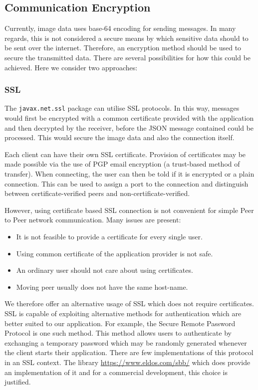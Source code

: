 \documentclass[10pt, a4paper]{article}
\begin{document}
\subsection{Communication Encryption}

Currently, image data uses base-64 encoding for sending messages.
In many regards, this is not considered a secure means by which sensitive data should to be sent over the internet.
Therefore, an encryption method should be used to secure the transmitted data.
There are several possibilities for how this could be achieved.
Here we consider two approaches:

\subsubsection{SSL}

The \verb|javax.net.ssl| package can utilise SSL protocols.
In this way, messages would first be encrypted with a common certificate provided with the application and then decrypted by the receiver, before the JSON message contained could be processed.
This would secure the image data and also the connection itself.

Each client can have their own SSL certificate.
Provision of certificates may be made possible via the use of PGP email encryption (a trust-based method of transfer).
When connecting, the user can then be told if it is encrypted or a plain connection.
This can be used to assign a port to the connection and distinguish between certificate-verified peers and non-certificate-verified.

However, using certificate based SSL connection is not convenient for simple Peer to Peer network communication.
Many issues are present:
\begin{itemize}
	\item It is not feasible to provide a certificate for every single user.
	\item Using common certificate of the application provider is not safe.
	\item An ordinary user should not care about using certificates.
	\item Moving peer usually does not have the same host-name.
\end{itemize}

We therefore offer an alternative usage of SSL which does not require certificates.
SSL is capable of exploiting alternative methods for authentication which are better suited to our application. For example, the Secure Remote Password Protocol \cite{srp} is one such method.
This method allows users to authenticate by exchanging a temporary password which may be randomly generated whenever the client starts their application.
There are few implementations of this protocol in an SSL context.
The library \href{SecureBlackBox}{https://www.eldos.com/sbb/} which does provide an implementation of it and for a commercial development, this choice is justified.
\end{document}
